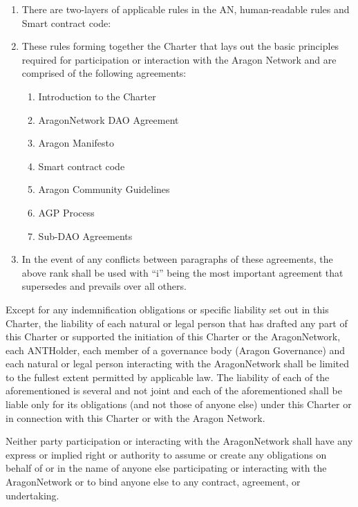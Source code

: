 \begin{enumerate}
	\begin{enumerate}
		\item There are two-layers of applicable rules in the \ac{AN}, human-readable rules and Smart contract code:
		\item These rules forming together the Charter that lays out the basic principles required for participation or interaction with the Aragon Network and are comprised of the following agreements:
		\begin{enumerate}
			\item Introduction to the Charter
			\item \gls{AragonNetwork} \ac{DAO} Agreement
			\item Aragon Manifesto
			\item Smart contract code
			\item Aragon Community Guidelines
			\item \ac{AGP} Process
			\item Sub-\ac{DAO} Agreements
		\end{enumerate}
		\item In the event of any conflicts between paragraphs of these agreements, the above
		rank shall be used with “i” being the most important agreement that supersedes and prevails over all others.
	\end{enumerate}
	Except for any indemnification obligations or specific liability set out in this Charter, 
	the liability of each natural or legal person that has drafted any part of this Charter or supported the initiation of this Charter or the \gls{AragonNetwork}, 
	each \gls{ANTHolder}, 
	each member of a governance body (Aragon Governance) and 
	each natural or legal person interacting with the \gls{AragonNetwork} 
	shall be limited to the fullest extent permitted by applicable law. 
	The liability of 
	each of the aforementioned is several and not joint and 
	each of the aforementioned shall be liable only for its obligations (and not those of anyone else) under this Charter or in connection with this Charter or with the Aragon Network.
	
	Neither party participation or interacting with the \gls{AragonNetwork} shall have any 
	express or implied right or authority to assume or create any obligations on behalf of or in the name of anyone else participating or interacting with the \gls{AragonNetwork} or to bind anyone else to any contract, agreement, or undertaking.
	

\end{enumerate}
